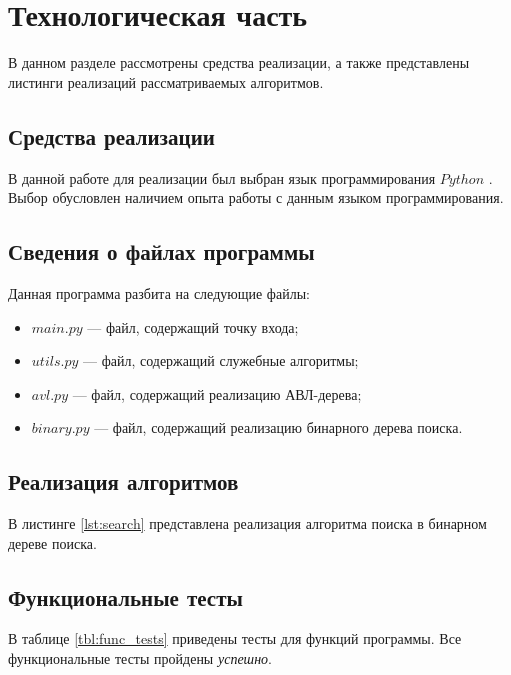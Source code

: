\chapter{Технологическая часть}

В данном разделе рассмотрены средства реализации, а также представлены листинги реализаций рассматриваемых алгоритмов.

\section{Средства реализации}

В данной работе для реализации был выбран язык программирования $Python$ \cite{python-lang}.
Выбор обусловлен наличием опыта работы с данным языком программирования.

\section{Сведения о файлах программы}

Данная программа разбита на следующие файлы:
\begin{itemize}
	\item $main.py$ --- файл, содержащий точку входа;
	\item $utils.py$ --- файл, содержащий служебные алгоритмы;
	\item $avl.py$ --- файл, содержащий реализацию АВЛ-дерева;
	\item $binary.py$ --- файл, содержащий реализацию бинарного дерева поиска.
\end{itemize}

\section{Реализация алгоритмов}

В листинге \ref{lst:search} представлена реализация алгоритма поиска в бинарном дереве поиска.



\section{Функциональные тесты}

В таблице \ref{tbl:func_tests} приведены тесты для функций программы. Все функциональные тесты пройдены \textit{успешно}.

